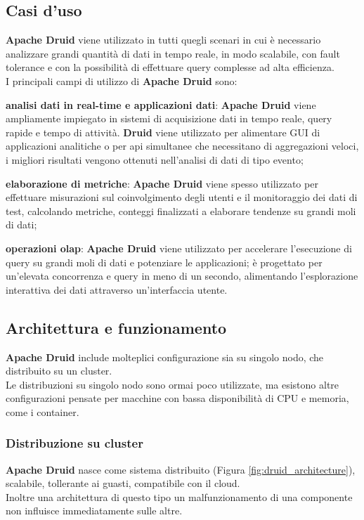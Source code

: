 \subsection{Casi d'uso}
\textbf{Apache Druid} viene utilizzato in tutti quegli scenari in cui è necessario analizzare grandi quantità di dati in tempo reale, in modo scalabile, con \gls{fault tolerance}{} e con la possibilità di effettuare query complesse ad alta efficienza.\\  
I principali campi di utilizzo di \textbf{Apache Druid} sono:
\begin{list}{*}
    \item \textbf{analisi dati in real-time e applicazioni dati}: \textbf{Apache Druid} viene ampliamente impiegato in sistemi di acquisizione dati in
    tempo reale, query rapide e tempo di attività. \textbf{Druid} viene utilizzato per alimentare GUI
    di applicazioni analitiche o per \gls{api}{} simultanee che necessitano di aggregazioni veloci, i migliori risultati 
    vengono ottenuti nell'analisi di dati di tipo evento;
    \item \item \textbf{elaborazione di metriche}: \textbf{Apache Druid} viene spesso utilizzato per effettuare misurazioni sul coinvolgimento degli
    utenti e il monitoraggio dei dati di test, calcolando metriche, conteggi finalizzati a elaborare tendenze su grandi moli di dati;
    \item \textbf{operazioni \gls{olap}{}}: \textbf{Apache Druid} viene utilizzato per accelerare l’esecuzione di query su grandi moli di dati e potenziare le applicazioni; è progettato per un’elevata concorrenza e query in meno di un secondo, alimentando
    l’esplorazione interattiva dei dati attraverso un’interfaccia utente.
\end{list}
\subsection{Architettura e funzionamento}
\textbf{Apache Druid} include molteplici configurazione sia su singolo nodo, che distribuito su un \gls{cluster}{}.\\
Le distribuzioni su singolo nodo sono ormai poco utilizzate, ma esistono altre configurazioni pensate per macchine con bassa disponibilità di 
CPU e memoria, come i \gls{container}{}.
\subsubsection{Distribuzione su cluster}
\textbf{Apache Druid} nasce come sistema distribuito (Figura \ref{fig:druid_architecture}), scalabile, tollerante ai guasti, compatibile con il cloud. \\
Inoltre una architettura di questo tipo un malfunzionamento di una componente non influisce immediatamente sulle altre.\\

